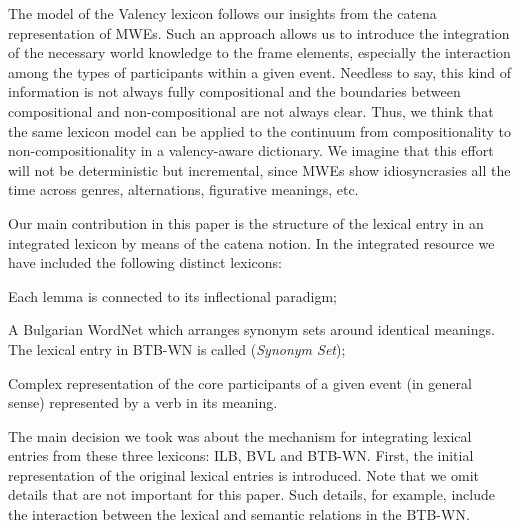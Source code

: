 \documentclass[output=paper,colorlinks,citecolor=brown]{langscibook}
\begin{document}
The model of the Valency lexicon follows our insights from the catena representation of MWEs. Such an approach allows us to introduce the integration of the necessary world knowledge to the frame elements, especially the interaction among the types of participants within a given event. Needless to say, this kind of information is not always fully compositional and the boundaries between compositional and non-compositional are not always clear. Thus, we think that the same lexicon model can be applied to the continuum from compositionality to non-compositionality in a valency-aware dictionary. We imagine that this effort will not be deterministic but incremental, since MWEs show idiosyncrasies all the time across genres, alternations, figurative meanings, etc. 

Our main contribution in this paper is the structure of the lexical entry in an integrated lexicon by means of the catena notion. In the integrated resource we have included the following distinct lexicons:

\begin{description}\sloppy
    \item[Inflectional lexicon of Bulgarian (ILB):] Each lemma is connected to its inflectional paradigm;
    \item[BTB Bulgarian WordNet (BTB-WN):] A Bulgarian WordNet which arran\-ges synonym sets around identical meanings. The lexical entry in BTB-WN is called  (\textit{Synonym Set});
    \item[Bulgarian Valency Lexicon (BVL):] Complex representation of the core participants of a given event (in general sense) represented by a verb in its meaning.
\end{description}

The main decision we took was about the mechanism for integrating lexical entries from these three lexicons: ILB, BVL and BTB-WN. First, the initial representation of the original lexical entries is introduced. Note that we omit details that are not important for this paper. Such details, for example, include the interaction between the lexical and semantic relations in the BTB-WN.
\end{document}
